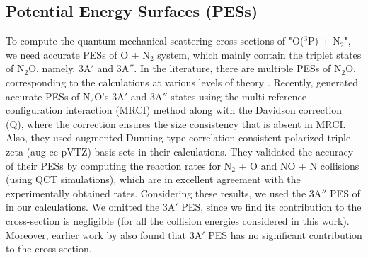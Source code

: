 \documentclass[fleqn,usenatbib]{mnras}
\begin{document}
\subsection{Potential Energy Surfaces (PESs)}
To compute the quantum-mechanical scattering cross-sections of "O($^3$P) + N$_2$", we need accurate PESs of O + N$_2$ system, which mainly contain the triplet states of N$_2$O, namely, 3A$'$ and 3A$''$. In the literature, there are multiple PESs of N$_2$O, corresponding to the calculations at various levels of theory \citep{walch1987calculated, gamallo2003ab, lin2016global, denis2017reactive, gamallo2003quantum}. Recently, \cite{koner2020accurate} generated accurate PESs of N$_2$O's 3A$'$ and 3A$''$ states using the multi-reference configuration interaction (MRCI) method along with the Davidson correction (Q), where the correction ensures the size consistency that is absent in MRCI. Also, they used augmented Dunning-type correlation consistent polarized triple zeta (aug-cc-pVTZ) basis sets in their calculations. They validated the accuracy of their PESs by computing the reaction rates for N$_2$ + O and NO + N collisions (using QCT simulations), which are in excellent agreement with the experimentally obtained rates. Considering these results, we used the 3A$''$ PES of  \cite{koner2020accurate} in our calculations. We omitted the 3A$'$ PES, since we find its contribution to the cross-section is negligible (for all the collision energies considered in this work). Moreover, earlier work by \cite{https://doi.org/10.1029/98JA02198} also found that 3A$'$ PES has no significant contribution to the cross-section. 
\end{document}
